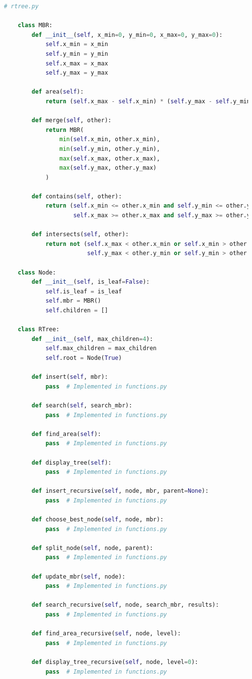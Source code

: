 \documentclass{article}
\begin{document}
\begin{lstlisting}[language=python]
	# rtree.py

	class MBR:
		def __init__(self, x_min=0, y_min=0, x_max=0, y_max=0):
			self.x_min = x_min
			self.y_min = y_min
			self.x_max = x_max
			self.y_max = y_max
		
		def area(self):
			return (self.x_max - self.x_min) * (self.y_max - self.y_min)
		
		def merge(self, other):
			return MBR(
				min(self.x_min, other.x_min),
				min(self.y_min, other.y_min),
				max(self.x_max, other.x_max),
				max(self.y_max, other.y_max)
			)
		
		def contains(self, other):
			return (self.x_min <= other.x_min and self.y_min <= other.y_min and
					self.x_max >= other.x_max and self.y_max >= other.y_max)
		
		def intersects(self, other):
			return not (self.x_max < other.x_min or self.x_min > other.x_max or
						self.y_max < other.y_min or self.y_min > other.y_max)

	class Node:
		def __init__(self, is_leaf=False):
			self.is_leaf = is_leaf
			self.mbr = MBR()
			self.children = []

	class RTree:
		def __init__(self, max_children=4):
			self.max_children = max_children
			self.root = Node(True)
		
		def insert(self, mbr):
			pass  # Implemented in functions.py
		
		def search(self, search_mbr):
			pass  # Implemented in functions.py
		
		def find_area(self):
			pass  # Implemented in functions.py
		
		def display_tree(self):
			pass  # Implemented in functions.py
		
		def insert_recursive(self, node, mbr, parent=None):
			pass  # Implemented in functions.py
		
		def choose_best_node(self, node, mbr):
			pass  # Implemented in functions.py
		
		def split_node(self, node, parent):
			pass  # Implemented in functions.py
		
		def update_mbr(self, node):
			pass  # Implemented in functions.py
		
		def search_recursive(self, node, search_mbr, results):
			pass  # Implemented in functions.py
		
		def find_area_recursive(self, node, level):
			pass  # Implemented in functions.py
		
		def display_tree_recursive(self, node, level=0):
			pass  # Implemented in functions.py
\end{lstlisting}
\end{document}
